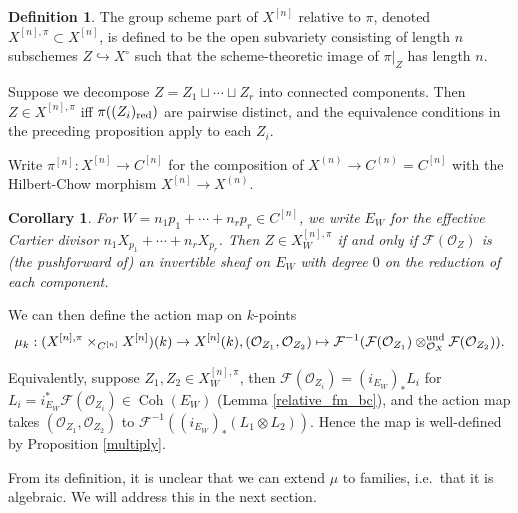 \documentclass{amsart}
\theoremstyle{plain}
\newtheorem{corollary}[theorem]{Corollary}
\theoremstyle{definition}
\newtheorem{definition}[theorem]{Definition}
\theoremstyle{remark}
\begin{document}
    \begin{definition}
        The group scheme part of $X^{[n]}$ relative to $\pi$, denoted $X^{[n],\pi}\subset X^{[n]}$, is defined to be the open subvariety consisting of length $n$ subschemes $Z\hookrightarrow X^\circ$ such that the scheme-theoretic image of $\pi|_Z$ has length $n$.
    \end{definition}
    Suppose we decompose $Z=Z_1\sqcup\cdots\sqcup Z_r$ into connected components.
    Then $Z\in X^{[n],\pi}$ iff $\pi((Z_i)_{\rm red})$ are pairwise distinct, and the equivalence conditions in the preceding proposition apply to each $Z_i$.

    Write $\pi^{[n]}:X^{[n]}\to C^{[n]}$ for the composition of $X^{(n)}\to C^{(n)}=C^{[n]}$ with the Hilbert-Chow morphism $X^{[n]}\to X^{(n)}$.
    \begin{corollary}
        For $W=n_1p_1+\cdots+n_rp_r\in C^{[n]}$, we write $E_W$ for the effective Cartier divisor $n_1X_{p_1}+\cdots +n_rX_{p_r}$.
        Then $Z\in X^{[n],\pi}_W$ if and only if $\mathcal F(\mathcal O_Z)$ is (the pushforward of) an invertible sheaf on $E_W$ with degree $0$ on the reduction of each component.
    \end{corollary}

    We can then define the action map on $k$-points
    \[\mu_k:(X^{[n],\pi}\times_{C^{[n]}}X^{[n]})(k)\to X^{[n]}(k),(\mathcal O_{Z_1},\mathcal O_{Z_2})\mapsto \mathcal F^{-1}(\mathcal F(\mathcal O_{Z_1})\otimes_{\mathcal O_X}^{\rm und}\mathcal F(\mathcal O_{Z_2})). \]

    Equivalently, suppose $Z_1,Z_2\in X^{[n],\pi}_W$, then $\mathcal F(\mathcal O_{Z_i})=(i_{E_W})_\ast L_i$ for $L_i=i_{E_W}^\ast \mathcal F(\mathcal O_{Z_i})\in\operatorname{Coh}(E_W)$ (Lemma \ref{relative_fm_bc}), and the action map takes $(\mathcal O_{Z_1},\mathcal O_{Z_2})$ to $\mathcal F^{-1}((i_{E_W})_\ast( L_1\otimes L_2))$.
    Hence the map is well-defined by Proposition \ref{multiply}.

    From its definition, it is unclear that we can extend $\mu$ to families, i.e.~that it is algebraic.
    We will address this in the next section.
\end{document}
